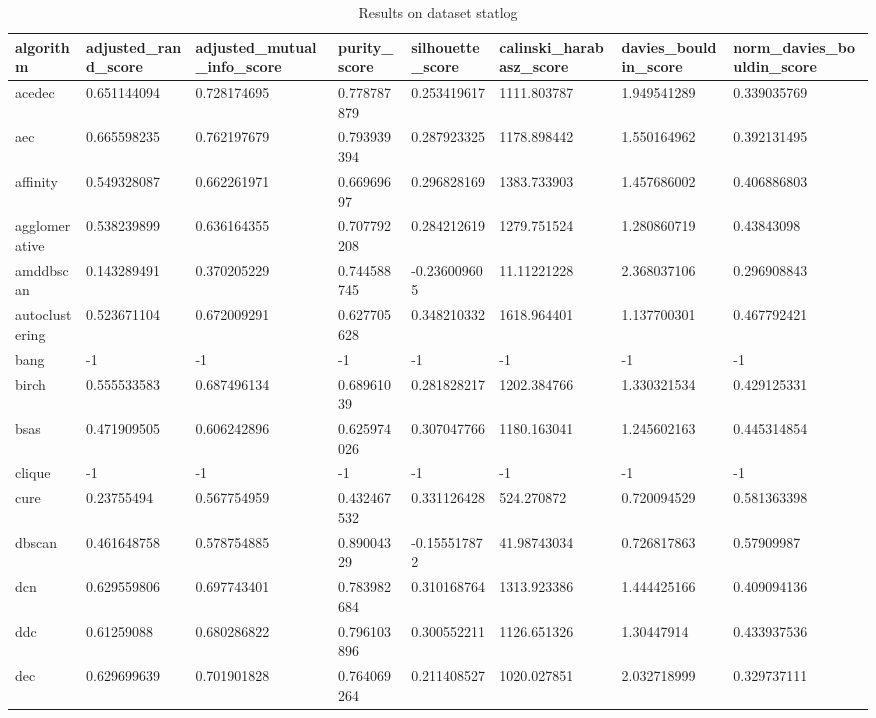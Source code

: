 \begin{table}[H]
\centering
\caption{Results on dataset statlog}
\label{tab:params:statlog}
\begin{tabular}{|l|l|l|l|l|l|l|l|}
\hline
algorithm & adjusted\_rand\_score & adjusted\_mutual\_info\_score & purity\_score & silhouette\_score & calinski\_harabasz\_score & davies\_bouldin\_score & norm\_davies\_bouldin\_score \\
\hline
acedec & 0.651144094 & 0.728174695 & 0.778787879 & 0.253419617 & 1111.803787 & 1.949541289 & 0.339035769 \\
\hline
aec & 0.665598235 & 0.762197679 & 0.793939394 & 0.287923325 & 1178.898442 & 1.550164962 & 0.392131495 \\
\hline
affinity & 0.549328087 & 0.662261971 & 0.66969697 & 0.296828169 & 1383.733903 & 1.457686002 & 0.406886803 \\
\hline
agglomerative & 0.538239899 & 0.636164355 & 0.707792208 & 0.284212619 & 1279.751524 & 1.280860719 & 0.43843098 \\
\hline
amddbscan & 0.143289491 & 0.370205229 & 0.744588745 & -0.236009605 & 11.11221228 & 2.368037106 & 0.296908843 \\
\hline
autoclustering & 0.523671104 & 0.672009291 & 0.627705628 & 0.348210332 & 1618.964401 & 1.137700301 & 0.467792421 \\
\hline
bang & -1 & -1 & -1 & -1 & -1 & -1 & -1 \\
\hline
birch & 0.555533583 & 0.687496134 & 0.68961039 & 0.281828217 & 1202.384766 & 1.330321534 & 0.429125331 \\
\hline
bsas & 0.471909505 & 0.606242896 & 0.625974026 & 0.307047766 & 1180.163041 & 1.245602163 & 0.445314854 \\
\hline
clique & -1 & -1 & -1 & -1 & -1 & -1 & -1 \\
\hline
cure & 0.23755494 & 0.567754959 & 0.432467532 & 0.331126428 & 524.270872 & 0.720094529 & 0.581363398 \\
\hline
dbscan & 0.461648758 & 0.578754885 & 0.89004329 & -0.155517872 & 41.98743034 & 0.726817863 & 0.57909987 \\
\hline
dcn & 0.629559806 & 0.697743401 & 0.783982684 & 0.310168764 & 1313.923386 & 1.444425166 & 0.409094136 \\
\hline
ddc & 0.61259088 & 0.680286822 & 0.796103896 & 0.300552211 & 1126.651326 & 1.30447914 & 0.433937536 \\
\hline
dec & 0.629699639 & 0.701901828 & 0.764069264 & 0.211408527 & 1020.027851 & 2.032718999 & 0.329737111 \\

\end{tabular}
\end{table}
